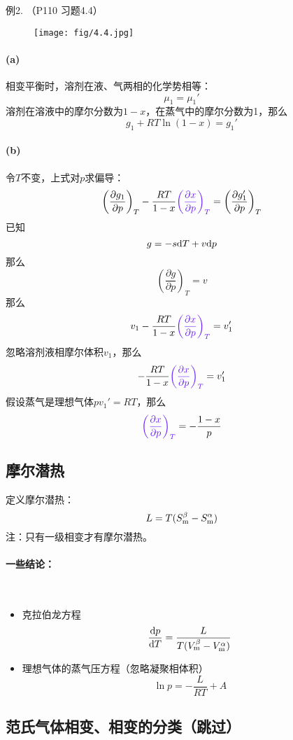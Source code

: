 \documentclass[UTF8,12pt]{ctexart}
\newenvironment{itemizeg}{\begin{itemize}}{\end{itemize}}
\newcommand{\pa}{\partial}
\newcommand{\tblue}{\textcolor[RGB]{100,24,255}}
\newcommand{\tblu}{\textcolor[RGB]{100,24,255}}
\newcommand{\tgre}{\textcolor{green!75!black}}
\begin{document}
\newpage
\begin{ebox}
\tblue{例2. （P110 习题4.4）}
\begin{figure}[H]
    \centering
    \texttt{[image: fig/4.4.jpg]}
\end{figure}
\paragraph*{(a)}相变平衡时，溶剂在液、气两相的化学势相等：
$$\mu_1=\mu_1'$$
溶剂在溶液中的摩尔分数为$1-x$，在蒸气中的摩尔分数为1，那么
$$g_1+RT\ln(1-x)=g_1'$$

\paragraph*{(b)}令$T$不变，上式对$p$求偏导：
$$\left(\frac{\pa g_1}{\pa p}\right)_T-\frac{RT}{1-x}\tblu{\left(\frac{\pa x}{\pa p}\right)_T}=\left(\frac{\pa g_1'}{\pa p}\right)_T$$
已知
$$g=-s{\rm d}T+v{\rm d}p$$
那么
$$\left(\frac{\pa g}{\pa p}\right)_T=v$$
那么
$$v_1-\frac{RT}{1-x}\tblu{\left(\frac{\pa x}{\pa p}\right)_T}=v_1'$$
忽略溶剂液相摩尔体积$v_1$，那么
$$-\frac{RT}{1-x}\tblu{\left(\frac{\pa x}{\pa p}\right)_T}=v_1'$$
假设蒸气是理想气体$pv_1'=RT$，那么
$$\tblu{\left(\frac{\pa x}{\pa p}\right)_T}=-\frac{1-x}{p}$$

\end{ebox}

\subsection{摩尔潜热}

定义摩尔潜热：
$$L=T(S_{\rm m}^\beta-S_{\rm m}^\alpha)$$
\tgre{注：只有一级相变才有摩尔潜热。}

\paragraph*{一些结论：}\
\begin{itemizeg}
    \item 克拉伯龙方程
    $$\frac{{\rm d}p}{{\rm d}T}=\frac{L}{T(V_{\rm m}^\beta-V_{\rm m}^\alpha)}$$
    
    \item 理想气体的蒸气压方程（忽略凝聚相体积）
    $$\ln p=-\frac{L}{RT}+A$$
    
\end{itemizeg}

\subsection{范氏气体相变、相变的分类（跳过）}
\end{document}
